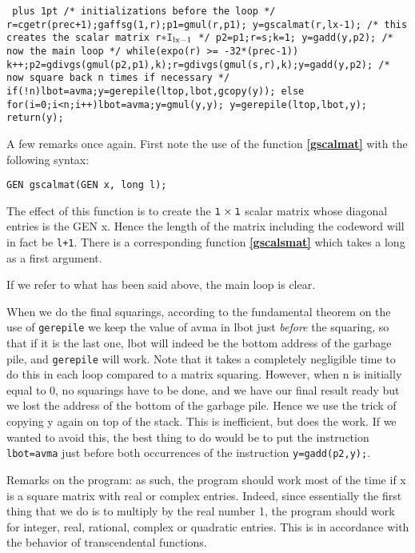 {\tt \obeylines\parskip=0pt plus 1pt
\hbox{}
/* initializations before the loop */
\hbox{}
\quad r=cgetr(prec+1);gaffsg(1,r);p1=gmul(r,p1);
\quad y=gscalmat(r,lx-1); /* this creates the scalar matrix r$*{\tt I_{\text {lx-1}}}$ */
\quad p2=p1;r=s;k=1;
\quad y=gadd(y,p2);
\hbox{}
  /* now the main loop */
\hbox{}
\quad while(expo(r) >= -32*(prec-1))
\qquad \obr k++;p2=gdivgs(gmul(p2,p1),k);r=gdivgs(gmul(s,r),k);y=gadd(y,p2);\cbr 
\hbox{}
  /* now square back n times if necessary */
\hbox{}
\quad if(!n)\obr lbot=avma;y=gerepile(ltop,lbot,gcopy(y));\cbr 
\quad else
\quad \obr 
\qquad for(i=0;i<n;i++)\obr lbot=avma;y=gmul(y,y);\cbr 
\qquad y=gerepile(ltop,lbot,y);
\quad \cbr 
\quad return(y);
\cbr 
}

A few remarks once again. First note the use of the function {\bf \ref{gscalmat}}
with the following syntax:

{\tt GEN gscalmat(GEN x, long l);}

The effect of this function is to create the ${\tt l}\times{\tt l}$ scalar
matrix whose diagonal entries is the GEN x. Hence the length of
the matrix including the codeword will in fact be {\tt l+1}.
There is a corresponding function
{\bf \ref{gscalsmat}} which takes a long as a first argument. 

If we refer to what has been said above, the main loop is clear.

When we do the final squarings, according to the fundamental theorem on the
use of {\tt gerepile} we keep the value of avma in lbot just {\it before} the
squaring, so that if it is the last one, lbot will indeed be the bottom address
of the garbage pile, and {\tt gerepile} will work. Note that it takes a completely
negligible time to do this in each loop compared to a matrix squaring.
However, when n is initially equal to 0, no squarings have to be done,
and we have our final result ready but we lost the address of the bottom of
the garbage pile. Hence we use the trick of copying y again on top of the
stack. This is inefficient, but does the work. If we wanted to avoid this,
the best thing to do would be to put the instruction {\tt lbot=avma} just before
both occurrences of the instruction {\tt y=gadd(p2,y);}.

Remarks on the program: as such, the program should work most of the time if
x is a square matrix with real or complex entries. Indeed, since essentially
the first thing that we do is to multiply by the real number 1, the program
should work for integer, real, rational, complex or quadratic entries. This
is in accordance with the behavior of transcendental functions.

